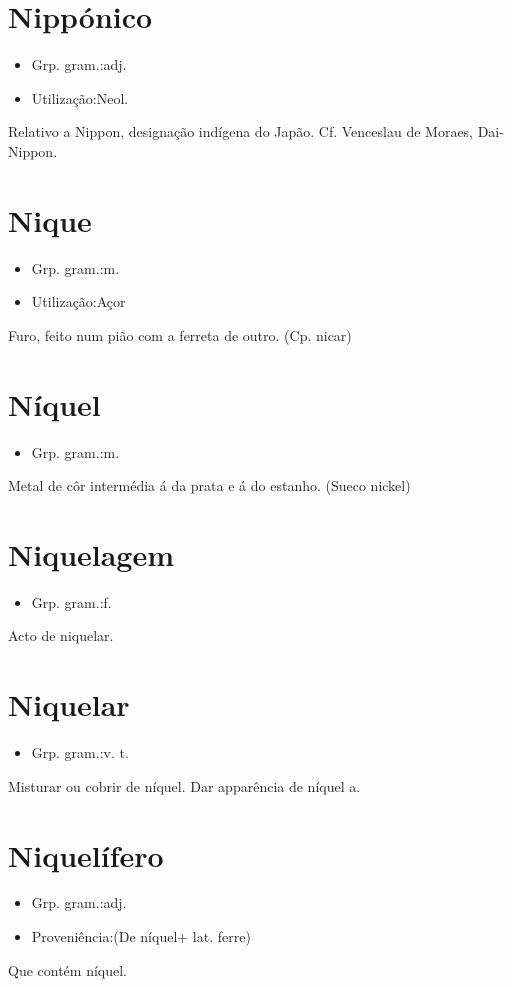 \section{Nippónico}
\begin{itemize}
\item {Grp. gram.:adj.}
\end{itemize}
\begin{itemize}
\item {Utilização:Neol.}
\end{itemize}
Relativo a Nippon, designação indígena do Japão. Cf. Venceslau de Moraes, \textunderscore Dai-Nippon\textunderscore .
\section{Nique}
\begin{itemize}
\item {Grp. gram.:m.}
\end{itemize}
\begin{itemize}
\item {Utilização:Açor}
\end{itemize}
Furo, feito num pião com a ferreta de outro.
(Cp. \textunderscore nicar\textunderscore )
\section{Níquel}
\begin{itemize}
\item {Grp. gram.:m.}
\end{itemize}
Metal de côr intermédia á da prata e á do estanho.
(Sueco \textunderscore nickel\textunderscore )
\section{Niquelagem}
\begin{itemize}
\item {Grp. gram.:f.}
\end{itemize}
Acto de niquelar.
\section{Niquelar}
\begin{itemize}
\item {Grp. gram.:v. t.}
\end{itemize}
Misturar ou cobrir de níquel.
Dar apparência de níquel a.
\section{Niquelífero}
\begin{itemize}
\item {Grp. gram.:adj.}
\end{itemize}
\begin{itemize}
\item {Proveniência:(De \textunderscore níquel\textunderscore  + lat. \textunderscore ferre\textunderscore )}
\end{itemize}
Que contém níquel.
